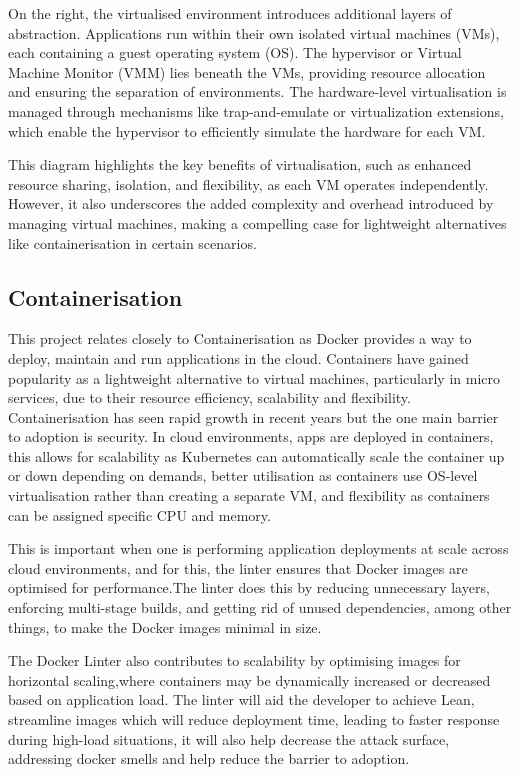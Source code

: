On the right, the virtualised environment introduces additional layers of abstraction. Applications run within their own isolated virtual machines (VMs), each containing a guest operating system (OS). The hypervisor or Virtual Machine Monitor (VMM) lies beneath the VMs, providing resource allocation and ensuring the separation of environments. The hardware-level virtualisation is managed through mechanisms like trap-and-emulate or virtualization extensions, which enable the hypervisor to efficiently simulate the hardware for each VM.

This diagram highlights the key benefits of virtualisation, such as enhanced resource sharing, isolation, and flexibility, as each VM operates independently. However, it also underscores the added complexity and overhead introduced by managing virtual machines, making a compelling case for lightweight alternatives like containerisation in certain scenarios.

\subsection{Containerisation}
This project relates closely to Containerisation as Docker provides a way to deploy, maintain and run applications in the cloud. Containers have gained popularity as a lightweight alternative to virtual machines, particularly in micro services, due to their resource efficiency, scalability and flexibility. Containerisation has seen rapid growth in recent years but the one main barrier to adoption is security.\cite{sultan2019container}  In cloud environments, apps are deployed in containers, this allows for scalability as Kubernetes can automatically scale the container up or down depending on demands, better utilisation as containers use OS-level virtualisation rather than creating a separate VM, and flexibility as containers can be assigned specific CPU and memory. \cite{hardikar2021containerization}

This is important when one is performing application deployments at scale across cloud environments, and for this, the linter ensures that Docker images are optimised for performance.The linter does this by reducing unnecessary layers, enforcing multi-stage builds, and getting rid of unused dependencies, among other things, to make the Docker images minimal in size.\cite{DockerSmellEmpherical}

The Docker Linter also contributes to scalability by optimising images for horizontal scaling,where containers may be dynamically increased or decreased based on application load. The linter will aid the developer to achieve Lean, streamline images which will reduce deployment time, leading to faster response during high-load situations, it will also help decrease the attack surface, addressing docker smells and help reduce the barrier to adoption. \cite{StudyofDockerSmells}

